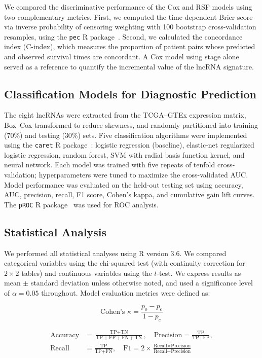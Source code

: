 \documentclass[12pt,a4paper]{article}
\begin{document}
We compared the discriminative performance of the Cox and RSF models using two complementary metrics. First, we computed the time-dependent Brier score via inverse probability of censoring weighting with 100 bootstrap cross-validation resamples, using the \texttt{pec} R package~\cite{ref26}. Second, we calculated the concordance index (C-index), which measures the proportion of patient pairs whose predicted and observed survival times are concordant. A Cox model using stage alone served as a reference to quantify the incremental value of the lncRNA signature.

\subsection{Classification Models for Diagnostic Prediction}

The eight lncRNAs were extracted from the TCGA--GTEx expression matrix, Box--Cox transformed to reduce skewness, and randomly partitioned into training (70\%) and testing (30\%) sets. Five classification algorithms were implemented using the \texttt{caret} R package~\cite{ref15}: logistic regression (baseline), elastic-net regularized logistic regression, random forest, SVM with radial basis function kernel, and neural network. Each model was trained with five repeats of tenfold cross-validation; hyperparameters were tuned to maximize the cross-validated AUC. Model performance was evaluated on the held-out testing set using accuracy, AUC, precision, recall, F1 score, Cohen's kappa, and cumulative gain lift curves. The \texttt{pROC} R package~\cite{ref27} was used for ROC analysis.

\subsection{Statistical Analysis}

We performed all statistical analyses using R version 3.6. We compared categorical variables using the chi-squared test (with continuity correction for $2 \times 2$ tables) and continuous variables using the $t$-test. We express results as mean $\pm$ standard deviation unless otherwise noted, and used a significance level of $\alpha = 0.05$ throughout. Model evaluation metrics were defined as:

\begin{equation}
\text{Cohen's } \kappa = \frac{p_o - p_e}{1 - p_e}
\end{equation}

\begin{align}
\text{Accuracy} &= \frac{\text{TP} + \text{TN}}{\text{TP} + \text{FP} + \text{FN} + \text{TN}}, \quad
\text{Precision} = \frac{\text{TP}}{\text{TP} + \text{FP}}, \nonumber\\
\text{Recall} &= \frac{\text{TP}}{\text{TP} + \text{FN}}, \quad
\text{F1} = 2 \times \frac{\text{Recall} \times \text{Precision}}{\text{Recall} + \text{Precision}}
\end{align}
\end{document}
